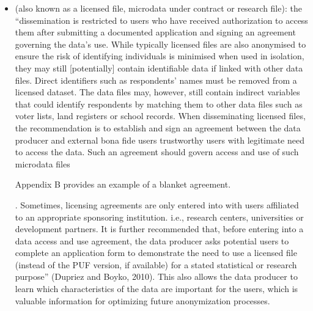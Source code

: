 \documentclass[letterpaper,10pt,english]{sphinxmanual}
\begin{document}
\begin{itemize}
\item {} 
 (also known as a licensed file,
microdata under contract or research file): the “dissemination is
restricted to users who have received authorization to access them
after submitting a documented application and signing an agreement
governing the data’s use. While typically licensed files are also
anonymised to ensure the risk of identifying individuals is minimised
when used in isolation, they may still {[}potentially{]} contain
identifiable data if linked with other data files. Direct identifiers
such as respondents’ names must be removed from a licensed dataset.
The data files may, however, still contain indirect variables that
could identify respondents by matching them to other data files such
as voter lists, land registers or school records. When disseminating
licensed files, the recommendation is to establish and sign an
agreement between the data producer and external bona fide users \textendash{}
trustworthy users with legitimate need to access the data. Such an
agreement should govern access and use of such microdata
files %
\begin{footnote}[3]\sphinxAtStartFootnote
Appendix B provides an example of a blanket agreement.
%
\end{footnote}. Sometimes, licensing agreements are only
entered into with users affiliated to an appropriate sponsoring
institution. i.e., research centers, universities or development
partners. It is further recommended that, before entering into a data
access and use agreement, the data producer asks potential users to
complete an application form to demonstrate the need to use a
licensed file (instead of the PUF version, if available) for a stated
statistical or research purpose” (Dupriez and Boyko, 2010). This also
allows the data producer to learn which characteristics of the data
are important for the users, which is valuable information for
optimizing future anonymization processes.


\end{itemize}
\end{document}
